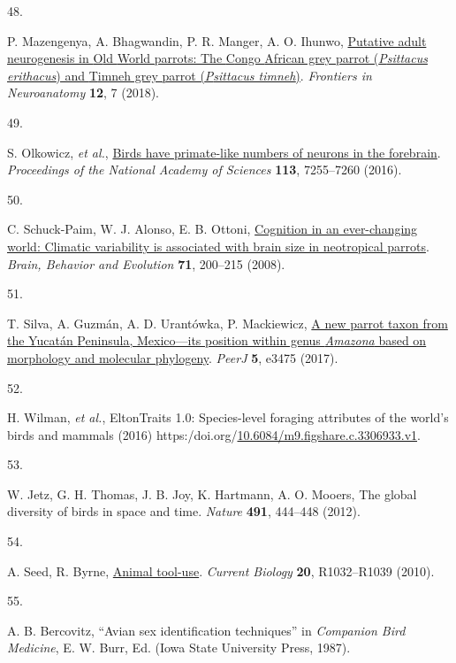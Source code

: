 \documentclass[
  man,floatsintext]{apa6}
\newlength{\cslhangindent}
\newlength{\csllabelwidth}
\newlength{\cslentryspacingunit} %
\newenvironment{CSLReferences}[2] %
 {%
  \setlength{\parindent}{0pt}
  \ifodd #1
  \let\oldpar\par
  \def\par{\hangindent=\cslhangindent\oldpar}
  \fi
  \setlength{\parskip}{#2\cslentryspacingunit}
 }%
 {}
\newcommand{\CSLLeftMargin}[1]{\parbox[t]{\csllabelwidth}{#1}}
\newcommand{\CSLRightInline}[1]{\parbox[t]{\linewidth - \csllabelwidth}{#1}\break}
\begin{document}
\begin{CSLReferences}{0}{0}
\leavevmode{}%
\CSLLeftMargin{48. }%
\CSLRightInline{P. Mazengenya, A. Bhagwandin, P. R. Manger, A. O. Ihunwo, \href{https://doi.org/10.3389/fnana.2018.00007}{Putative adult neurogenesis in {O}ld {W}orld parrots: The {C}ongo {A}frican grey parrot (\emph{{P}sittacus erithacus}) and {T}imneh grey parrot (\emph{{P}sittacus timneh})}. \emph{Frontiers in Neuroanatomy} \textbf{12}, 7 (2018).}

\leavevmode{}%
\CSLLeftMargin{49. }%
\CSLRightInline{S. Olkowicz, \emph{et al.}, \href{https://doi.org/10.1073/pnas.1517131113}{Birds have primate-like numbers of neurons in the forebrain}. \emph{Proceedings of the National Academy of Sciences} \textbf{113}, 7255--7260 (2016).}

\leavevmode{}%
\CSLLeftMargin{50. }%
\CSLRightInline{C. Schuck-Paim, W. J. Alonso, E. B. Ottoni, \href{https://doi.org/10.1159/000119710}{Cognition in an ever-changing world: Climatic variability is associated with brain size in neotropical parrots}. \emph{Brain, Behavior and Evolution} \textbf{71}, 200--215 (2008).}

\leavevmode{}%
\CSLLeftMargin{51. }%
\CSLRightInline{T. Silva, A. Guzmán, A. D. Urantówka, P. Mackiewicz, \href{https://doi.org/10.7717/peerj.3475}{A new parrot taxon from the {Y}ucat{á}n {P}eninsula, {M}exico---its position within genus \emph{{A}mazona} based on morphology and molecular phylogeny}. \emph{PeerJ} \textbf{5}, e3475 (2017).}

\leavevmode{}%
\CSLLeftMargin{52. }%
\CSLRightInline{H. Wilman, \emph{et al.}, EltonTraits 1.0: Species-level foraging attributes of the world's birds and mammals (2016) https:/doi.org/\href{https://doi.org/10.6084/m9.figshare.c.3306933.v1}{10.6084/m9.figshare.c.3306933.v1}.}

\leavevmode{}%
\CSLLeftMargin{53. }%
\CSLRightInline{W. Jetz, G. H. Thomas, J. B. Joy, K. Hartmann, A. O. Mooers, The global diversity of birds in space and time. \emph{Nature} \textbf{491}, 444--448 (2012).}

\leavevmode{}%
\CSLLeftMargin{54. }%
\CSLRightInline{A. Seed, R. Byrne, \href{https://doi.org/10.1016/j.cub.2010.09.042}{Animal tool-use}. \emph{Current Biology} \textbf{20}, R1032--R1039 (2010).}

\leavevmode{}%
\CSLLeftMargin{55. }%
\CSLRightInline{A. B. Bercovitz, {``Avian sex identification techniques''} in \emph{Companion Bird Medicine}, E. W. Burr, Ed. (Iowa State University Press, 1987).}


\end{CSLReferences}
\end{document}
